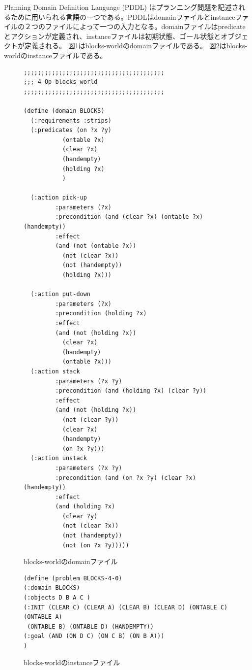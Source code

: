 \documentclass[b5paper]{report}
\begin{document}
Planning Domain Definition Language (PDDL) \cite{aeronautiques1998pddl}はプランニング問題を記述されるために用いられる言語の一つである。PDDLはdomainファイルとinstanceファイルの２つのファイルによって一つの入力となる。domainファイルはpredicateとアクションが定義され、instanceファイルは初期状態、ゴール状態とオブジェクトが定義される。
図\ref{fig:pddl-domain}はblocks-worldのdomainファイルである。
図\ref{fig:pddl-instance}はblocks-worldのinstanceファイルである。


\begin{figure}
\begin{adjustbox}{width=\textwidth,keepaspectratio}
\lstset{language=pddl}
\begin{lstlisting}
;;;;;;;;;;;;;;;;;;;;;;;;;;;;;;;;;;;;;;;;
;;; 4 Op-blocks world
;;;;;;;;;;;;;;;;;;;;;;;;;;;;;;;;;;;;;;;;

(define (domain BLOCKS)
  (:requirements :strips)
  (:predicates (on ?x ?y)
	       (ontable ?x)
	       (clear ?x)
	       (handempty)
	       (holding ?x)
	       )

  (:action pick-up
	     :parameters (?x)
	     :precondition (and (clear ?x) (ontable ?x) (handempty))
	     :effect
	     (and (not (ontable ?x))
		   (not (clear ?x))
		   (not (handempty))
		   (holding ?x)))

  (:action put-down
	     :parameters (?x)
	     :precondition (holding ?x)
	     :effect
	     (and (not (holding ?x))
		   (clear ?x)
		   (handempty)
		   (ontable ?x)))
  (:action stack
	     :parameters (?x ?y)
	     :precondition (and (holding ?x) (clear ?y))
	     :effect
	     (and (not (holding ?x))
		   (not (clear ?y))
		   (clear ?x)
		   (handempty)
		   (on ?x ?y)))
  (:action unstack
	     :parameters (?x ?y)
	     :precondition (and (on ?x ?y) (clear ?x) (handempty))
	     :effect
	     (and (holding ?x)
		   (clear ?y)
		   (not (clear ?x))
		   (not (handempty))
		   (not (on ?x ?y)))))
\end{lstlisting}
\end{adjustbox}
\caption{blocks-worldのdomainファイル}
\label{fig:pddl-domain}
\end{figure}

\begin{figure}
\begin{adjustbox}{width=\textwidth,keepaspectratio}
\lstset{language=pddl}
\begin{lstlisting}
(define (problem BLOCKS-4-0)
(:domain BLOCKS)
(:objects D B A C )
(:INIT (CLEAR C) (CLEAR A) (CLEAR B) (CLEAR D) (ONTABLE C) (ONTABLE A)
 (ONTABLE B) (ONTABLE D) (HANDEMPTY))
(:goal (AND (ON D C) (ON C B) (ON B A)))
)

\end{lstlisting}
\end{adjustbox}
\caption{blocks-worldのinstanceファイル}
\label{fig:pddl-instance}
\end{figure}
\end{document}
